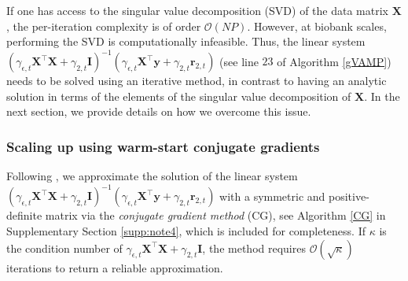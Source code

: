 If one has access to the singular value decomposition (SVD) of the data matrix $\bm{X}$, the per-iteration complexity is of order $\mathcal{O}(N P)$. However, at biobank scales, performing the SVD is computationally infeasible. Thus, the linear system $( \gamma_{\epsilon,t} \bm{X}^\top\bm{X} + \gamma_{2,t} \bm{I} )^{-1}(\gamma_{\epsilon, t} \bm{X}^\top \bm{y} + \gamma_{2,t} \bm{r}_{2,t})$ (see line $23$ of Algorithm \ref{gVAMP}) needs to be solved using an iterative method, in contrast to having an analytic solution in terms of the elements of the singular value decomposition of $\bm{X}$. In the next section, we provide details on how we overcome this issue.

\subsubsection{Scaling up using warm-start conjugate gradients}
Following \cite{schniter2021gampmatlab}, we approximate the solution of the linear system $( \gamma_{\epsilon,t} \bm{X}^\top\bm{X} + \gamma_{2,t} \bm{I} )^{-1}(\gamma_{\epsilon, t} \bm{X}^\top \bm{y} + \gamma_{2,t} \bm{r}_{2,t})$ with a symmetric and positive-definite matrix via the \textit{conjugate gradient method} (CG), see Algorithm \ref{CG} in Supplementary Section \ref{supp:note4}, which is included for completeness. If $\kappa$ is the condition number of $\gamma_{\epsilon,t} \bm{X}^\top\bm{X} + \gamma_{2,t} \bm{I}$, the method requires $\mathcal{O}(\sqrt{\kappa})$ iterations to return a reliable approximation. 

